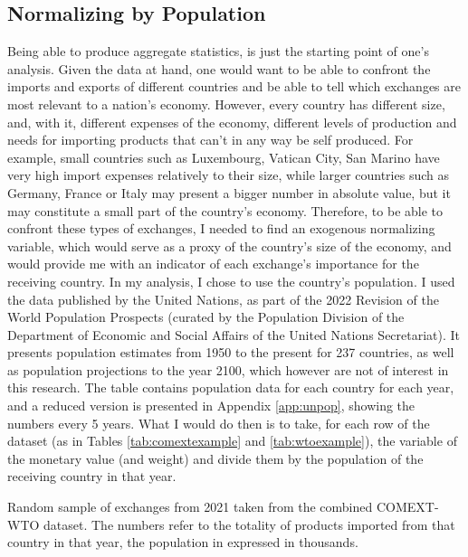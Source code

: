 \subsection{Normalizing by Population}
Being able to produce aggregate statistics, is just the starting point of one's analysis. Given the data at hand, one would want to be able to confront the imports and exports of different countries and be able to tell which exchanges are most relevant to a nation's economy. However, every country has different size, and, with it, different expenses of the economy, different levels of production and needs for importing products that can't in any way be self produced. For example, small countries such as Luxembourg, Vatican City, San Marino have very high import expenses relatively to their size, while larger countries such as Germany, France or Italy may present a bigger number in absolute value, but it may constitute a small part of the country's economy.
Therefore, to be able to confront these types of exchanges, I needed to find an exogenous normalizing variable, which would serve as a proxy of the country's size of the economy, and would provide me with an indicator of each exchange's importance for the receiving country. 
In my analysis, I chose to use the country's population. I used the data published by the United Nations, as part of the 2022 Revision of the World Population Prospects \cite{un2022population} (curated by the Population Division of the Department of Economic and Social Affairs of the United Nations Secretariat). It presents population estimates from 1950 to the present for 237 countries, as well as population projections to the year 2100, which however are not of interest in this research. The table contains population data for each country for each year, and a reduced version is presented in Appendix \ref{app:unpop}, showing the numbers every 5 years.
What I would do then is to take, for each row of the dataset (as in Tables \ref{tab:comextexample} and \ref{tab:wtoexample}), the variable of the monetary value (and weight) and divide them by the population of the receiving country in that year. 

\begin{table}
    \centering
    
    \caption[Random sample of exchanges from 2021 taken from the combined COMEXT-WTO dataset]{Random sample of exchanges from 2021 taken from the combined COMEXT-WTO dataset. The numbers refer to the totality of products imported from that country in that year, the population in expressed in thousands.}
    \label{tab:normexample}
\end{table}

